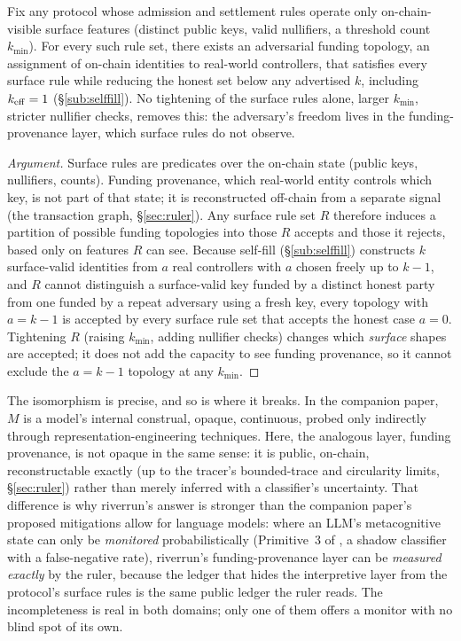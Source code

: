 \documentclass[11pt]{article}
\begin{document}
\begin{claimx}
\label{claim:incompleteness}
Fix any protocol whose admission and settlement rules operate only on-chain-visible surface
features (distinct public keys, valid nullifiers, a threshold count $k_{\min}$). For every
such rule set, there exists an adversarial funding topology, an assignment of on-chain
identities to real-world controllers, that satisfies every surface rule while reducing the
honest set below any advertised $k$, including $k_{\mathrm{eff}} = 1$ (\S\ref{sub:selffill}). No
tightening of the surface rules alone, larger $k_{\min}$, stricter nullifier checks,
removes this: the adversary's freedom lives in the funding-provenance layer, which surface
rules do not observe.
\end{claimx}

\begin{proof}[Argument]
Surface rules are predicates over the on-chain state (public keys, nullifiers, counts).
Funding provenance, which real-world entity controls which key, is not part of that state;
it is reconstructed off-chain from a separate signal (the transaction graph,
\S\ref{sec:ruler}). Any surface rule set $R$ therefore induces a partition of possible
funding topologies into those $R$ accepts and those it rejects, based only on features $R$
can see. Because self-fill (\S\ref{sub:selffill}) constructs $k$ surface-valid identities
from $a$ real controllers with $a$ chosen freely up to $k-1$, and $R$ cannot distinguish a
surface-valid key funded by a distinct honest party from one funded by a repeat adversary
using a fresh key, every topology with $a = k-1$ is accepted by every surface rule set that
accepts the honest case $a = 0$. Tightening $R$ (raising $k_{\min}$, adding nullifier
checks) changes which \emph{surface} shapes are accepted; it does not add the capacity to
see funding provenance, so it cannot exclude the $a = k-1$ topology at any $k_{\min}$.
\end{proof}

\begin{honest}
The isomorphism is precise, and so is where it breaks. In the companion paper, $M$ is a
model's internal construal, opaque, continuous, probed only indirectly through
representation-engineering techniques. Here, the analogous layer, funding provenance, is
not opaque in the same sense: it is public, on-chain, reconstructable exactly (up to the
tracer's bounded-trace and circularity limits, \S\ref{sec:ruler}) rather than merely
inferred with a classifier's uncertainty. That difference is why riverrun's answer is
stronger than the companion paper's proposed mitigations allow for language models: where
an LLM's metacognitive state can only be \emph{monitored} probabilistically (Primitive~3
of \cite{galmanus2026d}, a shadow classifier with a false-negative rate), riverrun's
funding-provenance layer can be \emph{measured exactly} by the ruler, because the ledger
that hides the interpretive layer from the protocol's surface rules is the same public
ledger the ruler reads. The incompleteness is real in both domains; only one of them offers
a monitor with no blind spot of its own.
\end{honest}
\end{document}

